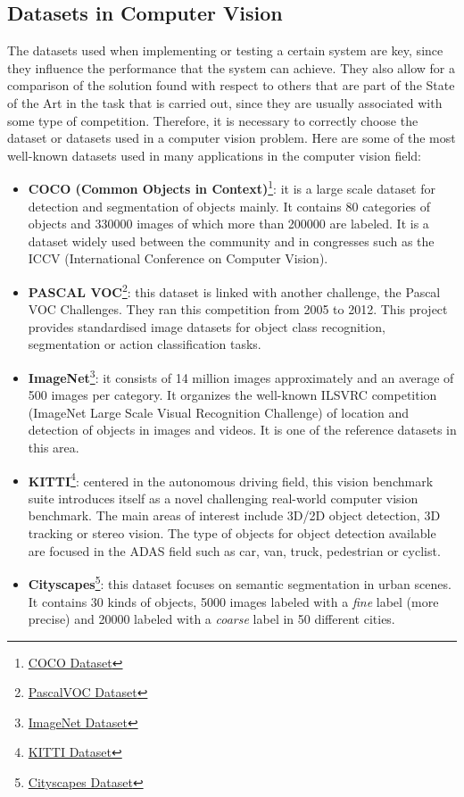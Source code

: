 \documentclass{bmvc2k}
\begin{document}
\subsection{Datasets in Computer Vision}
The datasets used when implementing or testing a certain system are key, since they influence the performance that the system can achieve. They also allow for a comparison of the solution found with respect to others that are part of the State of the Art in the task that is carried out, since they are usually associated with some type of competition. Therefore, it is necessary to correctly choose the dataset or datasets used in a computer vision problem. Here are some of the most well-known datasets used in many applications in the computer vision field:
\begin{itemize}
\item \textbf{COCO (Common Objects in Context)}\footnote {\href{http://cocodataset.org/#home}{COCO Dataset}}: it is a large scale dataset for detection and segmentation of objects mainly. It contains 80 categories of objects and 330000 images of which more than 200000 are labeled. It is a dataset widely used between the community and in congresses such as the ICCV (International Conference on Computer Vision).
\item \textbf{PASCAL VOC}\footnote {\href{http://host.robots.ox.ac.uk/pascal/VOC/}{PascalVOC Dataset}}: this dataset is linked with another challenge, the Pascal VOC Challenges. They ran this competition from 2005 to 2012. This project provides standardised image datasets for object class recognition, segmentation or action classification tasks.
\item \textbf{ImageNet}\footnote {\href{http://www.image-net.org/}{ImageNet Dataset}}: it consists of 14 million images approximately and an average of 500 images per category. It organizes the well-known ILSVRC competition (ImageNet Large Scale Visual Recognition Challenge) of location and detection of objects in images and videos. It is one of the reference datasets in this area.
\item \textbf{KITTI}\footnote {\href{http://www.cvlibs.net/datasets/kitti/}{KITTI Dataset}}: centered in the autonomous driving field, this vision benchmark suite introduces itself as a novel challenging real-world computer vision benchmark. The main areas of interest include 3D/2D object detection, 3D tracking or stereo vision. The type of objects for object detection available are focused in the ADAS field such as car, van, truck, pedestrian or cyclist.
\item \textbf{Cityscapes}\footnote {\href{https://www.cityscapes-dataset.com/}{Cityscapes Dataset}}: this dataset focuses on semantic segmentation in urban scenes. It contains 30 kinds of objects, 5000 images labeled with a \textit{fine} label (more precise) and 20000 labeled with a \textit{coarse} label in 50 different cities.

\end{itemize}
\end{document}
